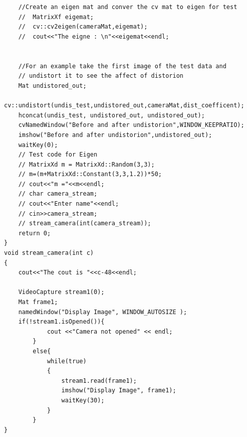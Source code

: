 \begin{verbatim}
    

    //Create an eigen mat and conver the cv mat to eigen for test
    //  MatrixXf eigemat;
    //  cv::cv2eigen(cameraMat,eigemat);
    //  cout<<"The eigne : \n"<<eigemat<<endl;


    //For an example take the first image of the test data and 
    // undistort it to see the affect of distorion
    Mat undistored_out;
    cv::undistort(undis_test,undistored_out,cameraMat,dist_coefficent);
    hconcat(undis_test, undistored_out, undistored_out);
    cvNamedWindow("Before and after undistorion",WINDOW_KEEPRATIO);
    imshow("Before and after undistorion",undistored_out);
    waitKey(0);
    // Test code for Eigen
    // MatrixXd m = MatrixXd::Random(3,3);
    // m=(m+MatrixXd::Constant(3,3,1.2))*50;
    // cout<<"m ="<<m<<endl;
    // char camera_stream;
    // cout<<"Enter name"<<endl;
    // cin>>camera_stream;
    // stream_camera(int(camera_stream));
    return 0;
}
void stream_camera(int c)
{
    cout<<"The cout is "<<c-48<<endl;

    VideoCapture stream1(0);
    Mat frame1;
    namedWindow("Display Image", WINDOW_AUTOSIZE );
    if(!stream1.isOpened()){
            cout <<"Camera not opened" << endl;
        }
        else{
            while(true)
            {
                stream1.read(frame1);
                imshow("Display Image", frame1);
                waitKey(30);
            }
        }
}
        \end{verbatim}
    

    
    

